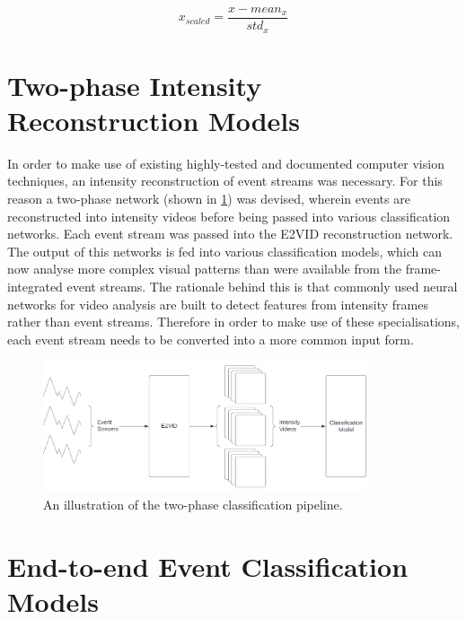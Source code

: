 \begin{equation}
    x_{scaled} = \frac{x - mean_x}{std_x}
    \label{eq:z_score}
\end{equation}

\section{Two-phase Intensity Reconstruction Models}

In order to make use of existing highly-tested and documented computer vision techniques, an intensity reconstruction of event streams was necessary. For this reason a two-phase network (shown in \cref{fig:two_phase_network_pipeline}) was devised, wherein events are reconstructed into intensity videos before being passed into various classification networks. Each event stream was passed into the E2VID reconstruction network\cite{spikingToVideo}. The output of this networks is fed into various classification models, which can now analyse more complex visual patterns than were available from the frame-integrated event streams. The rationale behind this is that commonly used neural networks for video analysis are built to detect features from intensity frames rather than event streams. Therefore in order to make use of these specialisations, each event stream needs to be converted into a more common input form.

\begin{figure}[htb]
    \centering
    \includegraphics[width=0.85\textwidth]{analysisanddesign/images/two_phase_network_pipeline.png}
    \caption{An illustration of the two-phase classification pipeline.}
    \label{fig:two_phase_network_pipeline}
\end{figure}

\section{End-to-end Event Classification Models} \label{sec:end_to_end_classification_design}


